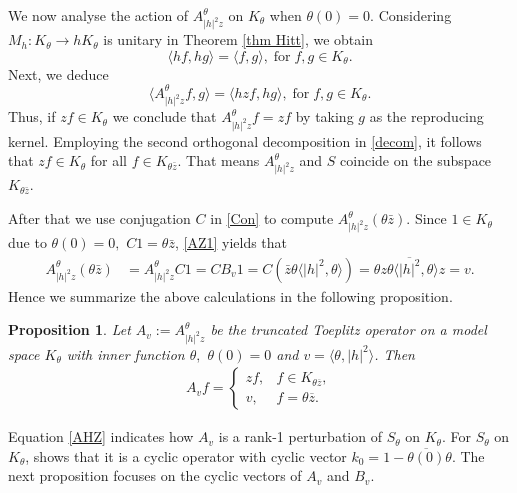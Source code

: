 \documentclass[12pt,reqno]{amsart}
\newtheorem{prop}[thm]{Proposition}
\theoremstyle{definition}
\theoremstyle{remark}
\numberwithin{equation}{section}
\newcommand{\la}{\langle}
\newcommand{\ra}{\rangle}
\newcommand{\ol}{\overline}
\begin{document}
  We now analyse the action of $A_{|h|^2 z}^\theta$  on $K_\theta$ when $\theta(0)=0.$  Considering $M_h: K_\theta \rightarrow  hK_\theta$ is unitary in Theorem \ref{thm Hitt},  we obtain $$\la hf, hg\ra=\la f,g\ra,\;\mbox{for}\;f, g\in K_\theta. $$ Next, we deduce $$\la A_{|h|^2 z}^\theta f, g\ra=\la  hzf, hg\ra,\;\mbox{for}\; f,g\in K_\theta. $$ Thus, if $zf\in K_\theta$ we conclude that $ A_{|h|^2 z}^\theta f=zf$ by taking $g$ as the reproducing kernel. Employing the second orthogonal decomposition in \eqref{decom}, it follows that $zf\in K_\theta$ for all $f\in K_{\theta \bar{z}}.$ That means $A_{|h|^2z}^\theta$ and $S$ coincide on the subspace  $K_{\theta \bar{z}}.$


After that we use conjugation $C$ in \eqref{Con} to compute $A_{|h|^2 z}^\theta (\theta \bar{z})$. Since $1\in K_\theta$ due to $\theta(0)=0,$ $C1=\theta\bar{z}$, \eqref{AZ1} yields that \begin{align*} A_{|h|^2 z}^\theta (\theta \bar{z})&=A_{|h|^2 z}^\theta C1=C B_v 1=C(\bar{z}\theta \la |h|^2, \theta\ra)= \theta \ol{z \theta \la |h|^2, \theta\ra}z=v. \end{align*}  Hence we summarize the above calculations in the following proposition.
\begin{prop}\label{Aztheta} Let $A_v:=A_{|h|^2z}^\theta$ be the truncated Toeplitz operator on
a model space $K_\theta$ with  inner function $\theta,$ $\theta(0)=0$ and $v=\la \theta, |h|^2\ra$. Then
 \begin{align}A_v f=\left\{ \begin{array}{ll}   zf, &  f\in K_{\theta \ol{z}}, \\ v, & f= \theta \ol{z}.  \end{array} \right.\label{AHZ}\end{align}
 \end{prop}
Equation \eqref{AHZ} indicates how $A_v$ is a rank-1 perturbation of $S_\theta$ on $K_\theta.$  For $S_\theta$ on $K_\theta$, \cite[Proposition 9.13]{GMR} shows that it is a cyclic operator with cyclic vector $k_0=1-\ol{\theta(0)}\theta.$  The next proposition focuses on the cyclic vectors of  $A_v$ and $B_v$.
\end{document}
